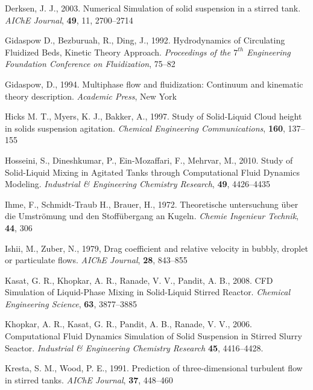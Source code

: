 \begin{thebibliography}{99}
 Derksen, J. J., 2003. Numerical Simulation of solid suspension in a stirred tank. \textit{AIChE Journal}, \textbf{49}, 11, 2700--2714

 Gidaspow D., Bezburuah, R., Ding, J., 1992. Hydrodynamics of Circulating Fluidized Beds, Kinetic Theory Approach. \textit{Proceedings of the $7^{th}$ Engineering Foundation Conference on Fluidization}, 75--82

 Gidaspow, D., 1994. Multiphase flow and fluidization: Continuum and kinematic theory description. \textit{Academic Press}, New York

 Hicks M. T., Myers, K. J.,  Bakker, A., 1997. Study of Solid-Liquid Cloud height in solids suspension agitation. \textit{Chemical Engineering Communications}, \textbf{160}, 137--155

 Hosseini, S., Dineshkumar, P., Ein-Mozaffari, F., Mehrvar, M., 2010. Study of Solid-Liquid Mixing in Agitated Tanks through Computational Fluid Dynamics Modeling. \textit{Industrial \& Engineering Chemistry Research}, \textbf{49}, 4426--4435

 Ihme, F., Schmidt-Traub H., Brauer, H., 1972. Theoretische untersuchung \"uber die Umstr\"omung und den Stoff\"ubergang an Kugeln. \textit{Chemie Ingenieur Technik}, \textbf{44}, 306

 Ishii, M., Zuber, N., 1979, Drag coefficient and relative velocity in bubbly, droplet or particulate flows. \textit{AIChE Journal}, \textbf{28}, 843--855 

 Kasat, G. R., Khopkar, A. R., Ranade, V. V., Pandit, A. B., 2008. CFD Simulation of Liquid-Phase Mixing in Solid-Liquid Stirred Reactor. \textit{Chemical Engineering Science}, \textbf{63}, 3877--3885

 Khopkar, A. R., Kasat, G. R., Pandit, A. B., Ranade, V. V., 2006. Computational Fluid Dynamics Simulation of Solid Suspension in Stirred Slurry Seactor. \textit{Industrial \& Engineering Chemistry Research} \textbf{45}, 4416--4428.

 Kresta, S. M., Wood, P. E., 1991. Prediction of three-dimensional turbulent flow in stirred tanks. \textit{AIChE Journal}, \textbf{37}, 448--460 


\end{thebibliography}

